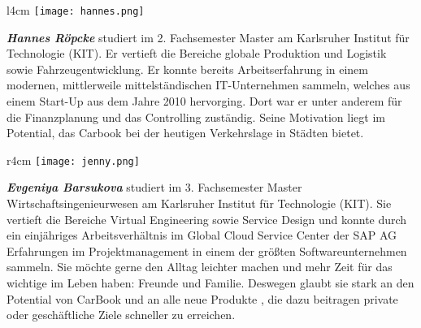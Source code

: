 \documentclass[12pt,ngerman, fleqn]{book} %
\begin{document}
\begin{wrapfigure}{l}{4cm}%
\centering
\texttt{[image: hannes.png]}
\end{wrapfigure}
\textbf{\textit{Hannes Röpcke}} studiert im 2. Fachsemester Master am Karlsruher Institut für Technologie (KIT). Er vertieft die Bereiche globale Produktion und Logistik sowie Fahrzeugentwicklung. Er konnte bereits Arbeitserfahrung in einem modernen, mittlerweile mittelständischen IT-Unternehmen sammeln, welches aus einem Start-Up aus dem Jahre 2010 hervorging. Dort war er unter anderem für die Finanzplanung und das Controlling zuständig. Seine Motivation liegt im Potential, das Carbook bei der heutigen Verkehrslage in Städten bietet. \linebreak

\begin{wrapfigure}{r}{4cm}%
\centering
\texttt{[image: jenny.png]}
\end{wrapfigure}
\textbf{\textit{Evgeniya Barsukova}} studiert im 3. Fachsemester Master Wirtschaftsingenieurwesen am Karlsruher Institut für Technologie (KIT). Sie vertieft die Bereiche Virtual Engineering sowie Service Design und konnte durch ein einjähriges Arbeitsverhältnis im Global Cloud Service Center der SAP AG Erfahrungen im Projektmanagement in einem der größten Softwareunternehmen sammeln. Sie möchte gerne den Alltag leichter machen und mehr Zeit für das wichtige im Leben haben: Freunde und Familie. Deswegen glaubt sie stark an den Potential von CarBook und an alle neue Produkte , die dazu beitragen private oder geschäftliche Ziele schneller zu erreichen.  

    
\end{document}
